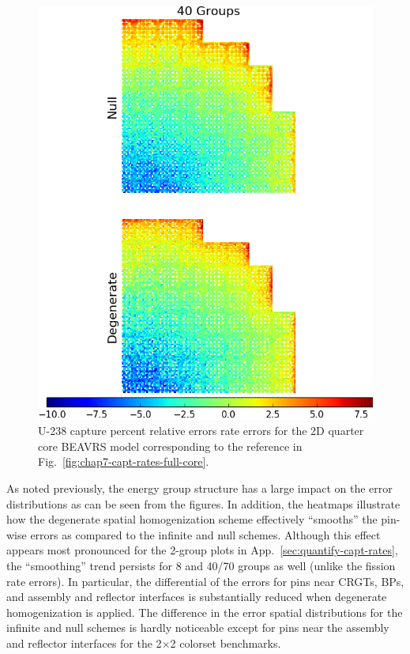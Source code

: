 \begin{figure}[h!]
\centering
\includegraphics[width=\linewidth]{figures/quantification/full-core/capt-err}
\vspace{2mm}
\caption[U-238 capture rate errors for the 2D quarter core \ac{BEAVRS} model]{U-238 capture percent relative errors rate errors for the 2D quarter core \ac{BEAVRS} model corresponding to the reference in Fig.~\ref{fig:chap7-capt-rates-full-core}.}
\label{fig:chap8-full-core-capt-err}
\end{figure}

\clearpage

As noted previously, the energy group structure has a large impact on the error distributions as can be seen from the figures. In addition, the heatmaps illustrate how the degenerate spatial homogenization scheme effectively ``smooths'' the pin-wise errors as compared to the infinite and null schemes. Although this effect appears most pronounced for the 2-group plots in App.~\ref{sec:quantify-capt-rates}, the ``smoothing'' trend persists for 8 and 40/70 groups as well (unlike the fission rate errors). In particular, the differential of the errors for pins near \acp{CRGT}, \acp{BP}, and assembly and reflector interfaces is substantially reduced when degenerate homogenization is applied. The difference in the error spatial distributions for the infinite and null schemes is hardly noticeable except for pins near the assembly and reflector interfaces for the 2$\times$2 colorset benchmarks.

